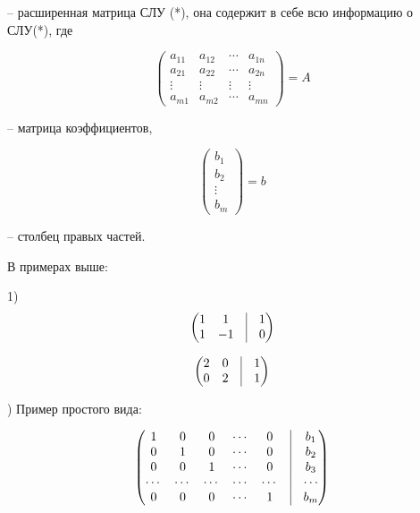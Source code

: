 -- расширенная матрица СЛУ (*), она содержит в себе всю информацию о СЛУ(*), где 

\begin{equation*}
	\begin{pmatrix}
		a_{11} & a_{12} & \cdots & a_{1n} \\
		a_{21} & a_{22} & \cdots & a_{2n} \\
       \vdots & \vdots & \vdots& \vdots \\ 
       a_{m1} & a_{m2} & \cdots & a_{mn}
	\end{pmatrix}
    = A
\end{equation*}

-- матрица коэффициентов,

\begin{equation*}
	\begin{pmatrix}
		b_1 \\
        b_2 \\
        \vdots \\
        b_m
	\end{pmatrix}
    = b
\end{equation*}

-- столбец правых частей.

\bigskip
В примерах выше:

1) 
\begin{equation*}
	\begin{pmatrix}
		1 & 1 & \vrule & 1 \\
        1 & -1 & \vrule & 0 
	\end{pmatrix}
\end{equation*}

\begin{equation*}
	\begin{pmatrix}
		2 & 0 & \vrule & 1 \\
        0 & 2 & \vrule & 1 
	\end{pmatrix}
\end{equation*}

) Пример простого вида:

\begin{equation*}
	\begin{pmatrix}
		1 & 0 & 0 & \cdots & 0 & \vrule & b_1 \\
		0 & 1 & 0 & \cdots & 0 & \vrule & b_2 \\
        0 & 0 & 1 & \cdots & 0 & \vrule & b_3 \\
        \cdots & \cdots & \cdots & \cdots & \cdots & \vrule & \cdots \\
        0 & 0 & 0 & \cdots & 1 & \vrule & b_m 
	\end{pmatrix}
\end{equation*}

